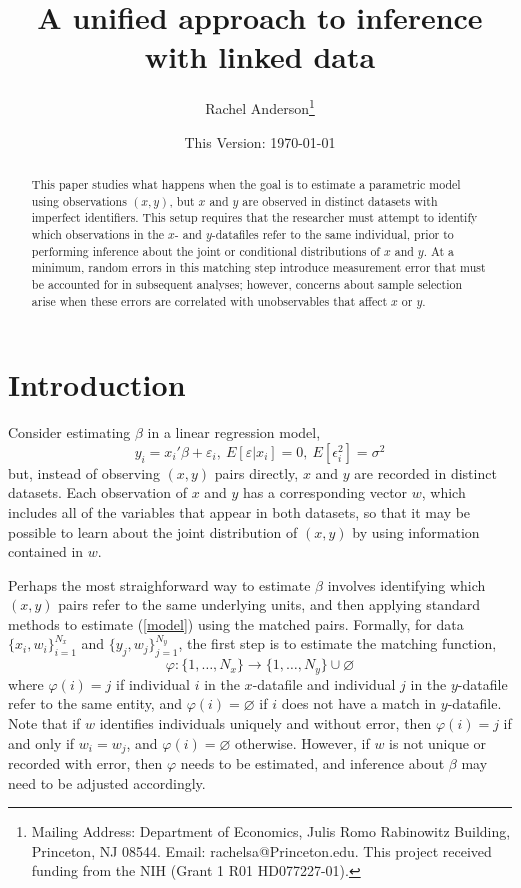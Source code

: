 \documentclass[12pt]{article}
\title{\singlespacing A unified approach to inference with linked data}
\author{Rachel Anderson\thanks{Mailing Address: Department of Economics, Julis Romo Rabinowitz Building,
Princeton, NJ 08544. Email: rachelsa@Princeton.edu.
This project received funding from the NIH (Grant 1 R01 HD077227-01). }}
\date{This Version: \today}
\begin{document}
\maketitle


\begin{abstract}
\singlespacing
\noindent This paper studies what happens when the goal is to estimate a parametric model using observations $(x,y)$, but $x$ and $y$ are observed in distinct datasets with imperfect identifiers.  This setup requires that the researcher must attempt to identify which observations in the $x$- and $y$-datafiles refer to the same individual, prior to performing inference about the joint or conditional distributions of $x$ and $y$.  At a minimum, random errors in this matching step introduce measurement error that must be accounted for in subsequent analyses; however, concerns about sample selection arise when these errors are correlated with unobservables that affect $x$ or $y$.  \end{abstract}


\section{Introduction}

Consider estimating $\beta$ in a linear regression model, \begin{equation} y_i = x_i'\beta + \varepsilon_i, \ E[\varepsilon | x_i] = 0, \ E[\epsilon_i^2] = \sigma^2  \label{model} \end{equation}
but, instead of observing $(x, y)$ pairs directly,  $x$ and $y$ are recorded in distinct datasets.  Each observation of $x$ and $y$ has a corresponding vector $w$, which includes all of the variables that appear in both datasets, so that it may be possible to learn about the joint distribution of $(x,y)$ by using information contained in $w$. 

Perhaps the most straighforward way to estimate $\beta$ involves identifying which $(x,y)$ pairs refer to the same underlying units, and then applying standard methods to estimate (\ref{model}) using the matched pairs.   Formally, for data $\{x_i, w_i\}_{i=1}^{N_x}$ and $\{y_j, w_j\}_{j=1}^{N_y}$, the first step is to estimate the matching function, \begin{equation} \varphi: \{1,\dots, N_x\} \to \{1,\dots, N_y\} \cup \varnothing \end{equation} where $\varphi(i) = j$ if individual $i$ in the $x$-datafile and individual $j$ in the $y$-datafile refer to the same entity, and $\varphi(i) = \varnothing$ if $i$ does not have a match in $y$-datafile.  Note that if $w$ identifies individuals uniquely and without error, then $\varphi(i) = j$ if and only if $w_i = w_j$, and $\varphi(i) = \varnothing$ otherwise.  However, if $w$ is not unique or recorded with error, then $\varphi$ needs to be estimated, and inference about $\beta$ may need to be adjusted accordingly.   
\end{document}
